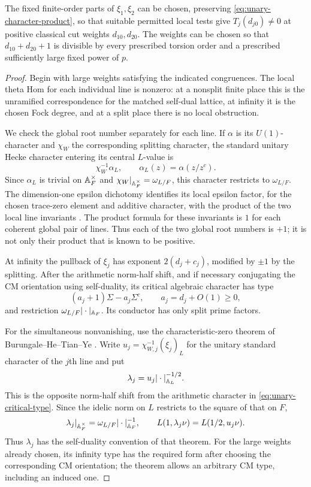 \begin{lemma}\label{lem:simultaneous-unary-nonvanishing}
 The fixed finite-order parts of $\xi_1,\xi_2$ can be chosen, preserving
 \eqref{eq:unary-character-product}, so that suitable permitted local
 tests give $T_j(d_{j0})\ne0$ at positive classical cut weights
 $d_{10},d_{20}$.  The weights can be chosen so that
 $d_{10}+d_{20}+1$ is divisible by every prescribed torsion order and
 a prescribed sufficiently large fixed power of $p$.
\end{lemma}
\begin{proof}
 Begin with large weights satisfying the indicated congruences.  The
 local theta Hom for each individual line is nonzero: at a nonsplit
 finite place this is the unramified correspondence for the matched
 self-dual lattice, at infinity it is the chosen Fock degree, and at a
 split place there is no local obstruction.

 We check the global root number separately for each line.  If $\alpha$
 is its $U(1)$-character and $\chi_W$ the corresponding splitting
 character, the standard unitary Hecke character entering its central
 $L$-value is
 \[
  \chi_W^{-1}\alpha_L,\qquad
  \alpha_L(z)=\alpha(z/z^c).
 \]
 Since $\alpha_L$ is trivial on $\mathbb A_F^\times$ and
 $\chi_W|_{\mathbb A_F^\times}=\omega_{L/F}$, this character restricts to
 $\omega_{L/F}$.  The dimension-one epsilon dichotomy identifies its
 local epsilon factor, for the chosen trace-zero element and additive
 character, with the product of the two local line invariants
 \cite[Theorem~3.5]{BoradeEtAl2025}.  The product formula for these
 invariants is $1$ for each coherent global pair of lines.  Thus each
 of the two global root numbers is $+1$; it is not only their product
 that is known to be positive.

 At infinity the pullback of $\xi_j$ has exponent $2(d_j+c_j)$,
 modified by $\pm1$ by the splitting.  After the arithmetic norm-half
 shift, and if necessary conjugating the CM orientation using
 self-duality, its critical algebraic character has type
 \begin{equation}\label{eq:unary-critical-type}
  (a_j+1)\Sigma-a_j\Sigma^c,
  \qquad a_j=d_j+O(1)\geq0,
 \end{equation}
 and restriction $\omega_{L/F}|\cdot|_{\mathbb A_F}$.  Its conductor has only
 split prime factors.

 For the simultaneous nonvanishing, use the characteristic-zero
 theorem of Burungale--He--Tian--Ye
 \cite[Theorem~1.1 and Corollary~4.20]{BHTY2026}.
 Write $u_j=\chi_{W,j}^{-1}(\xi_j)_L$ for the unitary standard
 character of the $j$th line and put
 \[
  \lambda_j=u_j|\cdot|_{\mathbb A_L}^{-1/2}.
 \]
 This is the opposite norm-half shift from the arithmetic character
 in \eqref{eq:unary-critical-type}.  Since the idelic norm on $L$
 restricts to the square of that on $F$,
 \[
  \lambda_j|_{\mathbb A_F^\times}
    =\omega_{L/F}|\cdot|_{\mathbb A_F}^{-1},\qquad
  L(1,\lambda_j\nu)=L(1/2,u_j\nu).
 \]
 Thus $\lambda_j$ has the self-duality convention of that theorem.
 For the large weights already chosen, its infinity type has the
 required form after choosing the corresponding CM orientation; the
 theorem allows an arbitrary CM type, including an induced one.


\end{proof}
